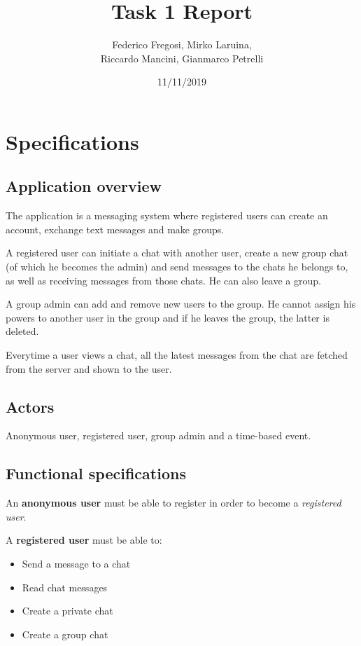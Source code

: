 \documentclass[10pt]{article}
\title{Task 1 Report}
\date{11/11/2019}
\author{Federico Fregosi, Mirko Laruina,\\
        Riccardo Mancini, Gianmarco Petrelli}
\begin{document}
\maketitle
\vfill
\tableofcontents
\vfill
\clearpage
\setcounter{page}{1}

\section{Specifications}
\subsection{Application overview}
The application is a messaging system where registered users can create an 
account, exchange text messages and make groups.

A registered user can initiate a chat with another user, create a new group chat
(of which he becomes the admin) and send messages to the chats he belongs to,
as well as receiving messages from those chats. He can also leave a group.

A group admin can add and remove new users to the group. He cannot assign his
powers to another user in the group and if he leaves the group, the latter 
is deleted.

Everytime a user views a chat, all the latest messages from the chat are fetched from 
the server and shown to the user.

\subsection{Actors}
Anonymous user, registered user, group admin and a time-based event.

\subsection{Functional specifications}

An \textbf{anonymous user} must be able to register in order to become a 
\emph{registered user}.

A \textbf{registered user} must be able to:
\begin{itemize}
    \item Send a message to a chat
    \item Read chat messages
    \item Create a private chat
    \item Create a group chat
\end{itemize}
\end{document}
